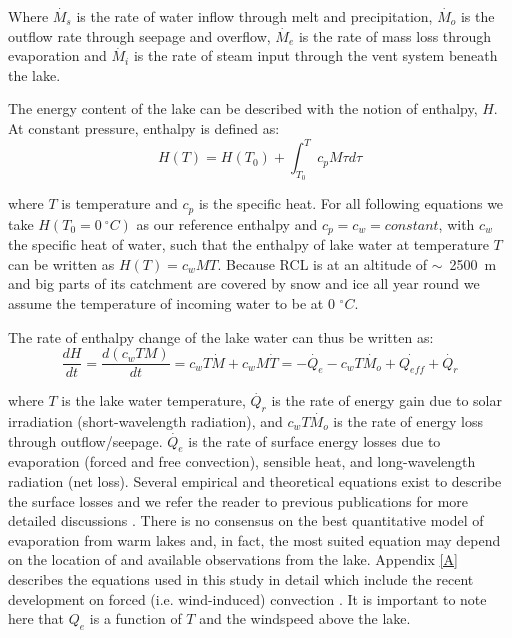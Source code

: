 \documentclass{bmcart}
\begin{document}
Where $\dot{M_s}$ is the rate of water inflow through melt and precipitation,
$\dot{M_o}$
is the outflow rate through seepage and overflow, $\dot{M_e}$ is the rate of mass
loss through evaporation and $\dot{M_i}$ is the rate of steam input through the vent
system beneath the lake.

The energy content of the lake can be described with the notion of
enthalpy, $H$. At constant pressure, enthalpy is defined as:
\begin{equation}
	H(T) = H(T_0) + \int_{T_0}^{T}c_pM\tau d\tau
\end{equation}

where $T$ is temperature and $c_p$ is the specific heat. For all following
equations we take $H(T_0=0~^{\circ}C)$ as our reference enthalpy and
$c_p=c_w=constant$, with $c_w$ the specific heat of water, such that the
enthalpy of lake water at temperature $T$ can be written as $H(T) = c_wMT$.
Because RCL is at an altitude of $\sim$~2500~m and big parts of its catchment
are covered by snow and ice all year round we assume the temperature of incoming
water to be at 0 $^{\circ}C$.

The rate of enthalpy change of the lake water can thus be written as:
\begin{equation}\label{ode_E}
    \frac{dH}{dt}=\frac{d(c_wTM)}{dt}=c_wT\dot{M} + c_wM\dot{T} =
	-\dot{Q_e} - c_wT\dot{M_o} + \dot{Q_{eff}} + \dot{Q_r}
\end{equation}
      
where $T$ is the lake water temperature, $\dot{Q_r}$ is the rate of energy gain
due to solar irradiation (short-wavelength radiation), and $c_wT\dot{M_o}$ is
the rate of energy loss through outflow/seepage. $\dot{Q_e}$ is the rate of
surface energy losses due to evaporation (forced and free convection), sensible
heat, and long-wavelength radiation (net loss). Several empirical and
theoretical equations exist to describe the surface losses and we refer the
reader to previous publications for more detailed discussions
\cite{Stevenson1992, hurstCraterLakeEnergy2015}. There is no consensus on the
best quantitative model of evaporation from warm lakes and, in fact, the most
suited equation may depend on the location of and available observations from
the lake. Appendix \ref{A} describes the equations used in this study in detail
which include the recent development on forced (i.e. wind-induced) convection
\cite{sartoriCriticalReviewEquations2000}. It is important to note here that
$Q_e$ is a function of $T$ and the windspeed above the lake. 
\end{document}
